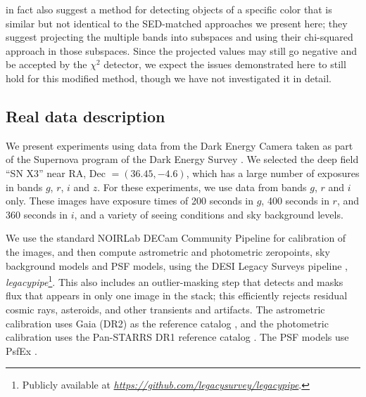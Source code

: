 \documentclass[11pt,letterpaper,linenumbers]{aastex7}
\newcommand{\niceurl}[1]{\mbox{\href{#1}{\textsl{#1}}}}
\begin{document}
\cite{szalay1999} in fact also suggest a method for detecting objects
of a specific color that is similar but not identical to the
SED-matched approaches we present here; they suggest projecting the
multiple bands into subspaces and using their chi-squared approach in
those subspaces.  Since the projected values may still go negative and
be accepted by the $\chi^2$ detector, we expect the issues
demonstrated here to still hold for this modified method, though we
have not investigated it in detail.


\subsection{Real data description}



We present experiments using data from the Dark Energy Camera
\citep{decam} taken as part of the Supernova program \citep{dessn} of
the Dark Energy Survey \citep{des}.  We selected the deep field ``SN
X3'' near RA, Dec $= (36.45, -4.6)$, which has a large number of
exposures in bands $g$, $r$, $i$ and $z$.  For these experiments, we
use data from bands $g$, $r$ and $i$ only.  These images have exposure
times of 200 seconds in $g$, 400 seconds in $r$, and 360 seconds in
$i$, and a variety of seeing conditions and sky background levels.

% 

We use the standard NOIRLab DECam Community Pipeline \citep{cppipeline}
for calibration of the images, and then compute astrometric and
photometric zeropoints, sky background models and PSF models, using
the DESI Legacy Surveys pipeline \citep{lsoverview, legacypipe},
\textsl{legacypipe}\footnote{Publicly available at
\niceurl{https://github.com/legacysurvey/legacypipe}.}.
This also includes an outlier-masking step that detects and masks flux that
appears in only one image in the stack; this efficiently rejects residual cosmic
rays, asteroids, and other transients and artifacts.
The astrometric
calibration uses Gaia (DR2) as the reference catalog \citep{gaiaDR1,
  gaia}, and the photometric calibration uses the Pan-STARRS DR1
reference catalog \citep{panstarrs}.  The PSF models use PsfEx
\citep{psfex}.
\end{document}
